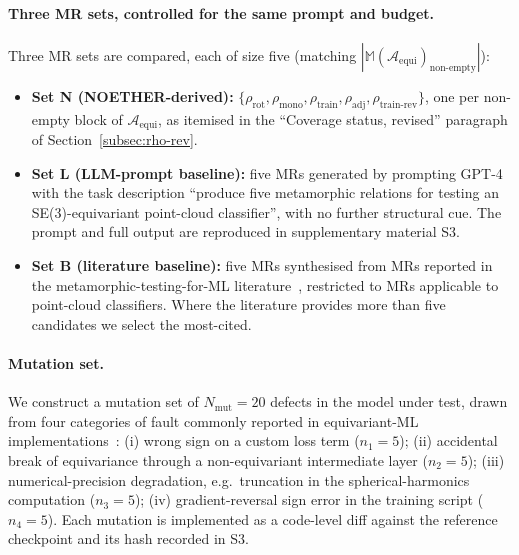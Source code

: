 \documentclass[manuscript]{acmart}
\begin{document}
\paragraph{Three MR sets, controlled for the same prompt and budget.}
Three MR sets are compared, each of size five (matching $|\mathbb{M}(\mathcal{A}_{\mathrm{equi}})_{\mathrm{non\text{-}empty}}|$):
\begin{itemize}
    \item \textbf{Set N (NOETHER-derived):} $\{\rho_{\mathrm{rot}},\rho_{\mathrm{mono}},\rho_{\mathrm{train}},\rho_{\mathrm{adj}},\rho_{\mathrm{train\text{-}rev}}\}$, one per non-empty block of $\mathcal{A}_{\mathrm{equi}}$, as itemised in the ``Coverage status, revised'' paragraph of Section~\ref{subsec:rho-rev}.
    \item \textbf{Set L (LLM-prompt baseline):} five MRs generated by prompting GPT-4 with the task description ``produce five metamorphic relations for testing an SE(3)-equivariant point-cloud classifier'', with no further structural cue. The prompt and full output are reproduced in supplementary material S3.
    \item \textbf{Set B (literature baseline):} five MRs synthesised from MRs reported in the metamorphic-testing-for-ML literature~\cite{Segura2016, Shin2024, AutoMT2025}, restricted to MRs applicable to point-cloud classifiers. Where the literature provides more than five candidates we select the most-cited.
\end{itemize}

\paragraph{Mutation set.}
We construct a mutation set of $N_{\mathrm{mut}} = 20$ defects in the model under test, drawn from four categories of fault commonly reported in equivariant-ML implementations~\cite{ThomasSmidt2018}: (i) wrong sign on a custom loss term ($n_1 = 5$); (ii) accidental break of equivariance through a non-equivariant intermediate layer ($n_2 = 5$); (iii) numerical-precision degradation, e.g.\ truncation in the spherical-harmonics computation ($n_3 = 5$); (iv) gradient-reversal sign error in the training script ($n_4 = 5$). Each mutation is implemented as a code-level diff against the reference checkpoint and its hash recorded in S3.
\end{document}
